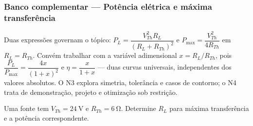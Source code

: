 
\subsubsection*{Banco complementar --- Potência elétrica e máxima transferência}

\begin{atencao}
Duas expressões governam o tópico:
$P_L=\dfrac{V_{Th}^{2}R_L}{(R_L+R_{Th})^{2}}$ e
$P_{\max}=\dfrac{V_{Th}^{2}}{4R_{Th}}$ em $R_L=R_{Th}$. Convém trabalhar com a
variável adimensional $x=R_L/R_{Th}$, pois
$\dfrac{P_L}{P_{\max}}=\dfrac{4x}{(1+x)^{2}}$ e
$\eta=\dfrac{x}{1+x}$ --- duas curvas universais, independentes dos valores
absolutos. O N3 explora simetria, tolerância e casos de contorno; o N4 trata de
demonstração, projeto e otimização sob restrição.
\end{atencao}

\blocofixacao

\begin{questao}[1]{}
Uma fonte tem $V_{Th}=\SI{24}{\volt}$ e $R_{Th}=\SI{6}{\ohm}$. Determine
$R_L$ para máxima transferência e a potência correspondente.
\end{questao}


